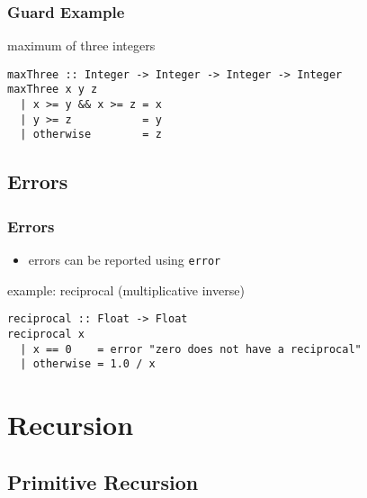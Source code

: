 \documentclass[dvipsnames]{beamer}
\theoremstyle{plain}
\begin{document}
\begin{frame}[fragile]
  \frametitle{Guard Example}

  \begin{exampleblock}{maximum of three integers}
    \begin{lstlisting}
maxThree :: Integer -> Integer -> Integer -> Integer
maxThree x y z
  | x >= y && x >= z = x
  | y >= z           = y
  | otherwise        = z
    \end{lstlisting}
  \end{exampleblock}
\end{frame}

\subsection{Errors}

\begin{frame}[fragile]
  \frametitle{Errors}

  \begin{itemize}
    \item errors can be reported using \lstinline{error}
  \end{itemize}

  \begin{exampleblock}{example: reciprocal (multiplicative inverse)}
    \begin{lstlisting}
reciprocal :: Float -> Float
reciprocal x
  | x == 0    = error "zero does not have a reciprocal"
  | otherwise = 1.0 / x
    \end{lstlisting}
  \end{exampleblock}
\end{frame}

\section{Recursion}

\subsection{Primitive Recursion}
\end{document}
